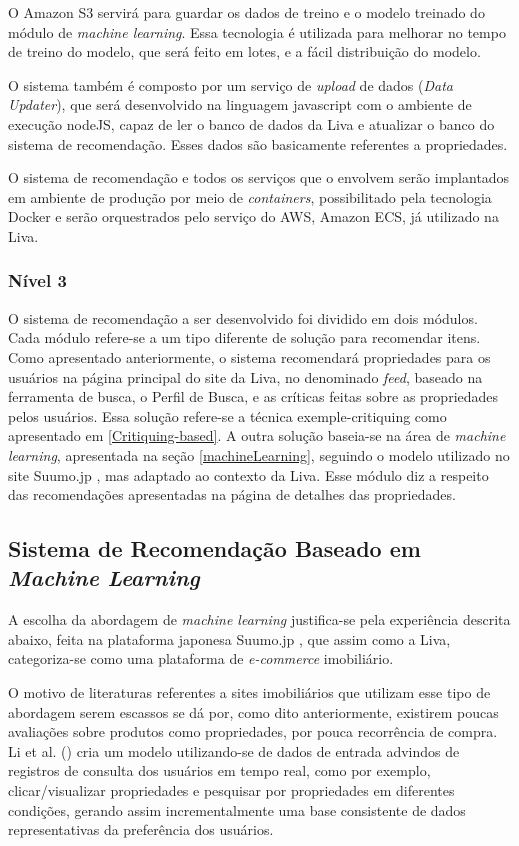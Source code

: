 O Amazon S3 servirá para guardar os dados de treino e o modelo treinado do módulo de \textit{machine learning}. Essa tecnologia é utilizada para melhorar no tempo de treino do modelo, que será feito em lotes, e a fácil distribuição do modelo.

O sistema também é composto por um serviço de \textit{upload} de dados (\textit{Data Updater}), que será desenvolvido na linguagem javascript com o ambiente de execução nodeJS, capaz de ler o banco de dados da Liva e atualizar o banco do sistema de recomendação. Esses dados são basicamente referentes a propriedades.

O sistema de recomendação e todos os serviços que o envolvem serão implantados em ambiente de produção por meio de \textit{containers}, possibilitado pela tecnologia Docker e serão orquestrados pelo serviço do AWS, Amazon ECS, já utilizado na Liva.
	
\subsubsection{Nível 3}
\label{nivel3}
O sistema de recomendação a ser desenvolvido foi dividido em dois módulos. Cada módulo refere-se a um tipo diferente de solução para recomendar itens. Como apresentado anteriormente, o sistema recomendará propriedades para os usuários na página principal do site da Liva, no denominado \textit{feed}, baseado na ferramenta de busca, o Perfil de Busca, e as críticas feitas sobre as propriedades pelos usuários. Essa solução refere-se a técnica exemple-critiquing como apresentado em \ref{Critiquing-based}. A outra solução baseia-se na área de \textit{machine learning}, apresentada na seção \ref{machineLearning}, seguindo o modelo utilizado no site Suumo.jp \cite{Summo:2017}, mas adaptado ao contexto da Liva. Esse módulo diz a respeito das recomendações apresentadas na página de detalhes das propriedades.

\subsection{Sistema de Recomendação Baseado em \textit{Machine Learning}}

A escolha da abordagem de \textit{machine learning} justifica-se pela experiência descrita abaixo, feita na plataforma japonesa Suumo.jp \cite{Summo:2017}, que assim como a Liva, categoriza-se como uma plataforma de \textit{e-commerce} imobiliário.

O motivo de literaturas referentes a sites imobiliários que utilizam esse tipo de abordagem serem escassos se dá por, como dito anteriormente, existirem poucas avaliações sobre produtos como propriedades, por pouca recorrência de compra. Li et al. (\citeyear{Summo:2017}) cria um modelo utilizando-se de dados de entrada advindos de registros de consulta dos usuários em tempo real, como por exemplo, clicar/visualizar propriedades e pesquisar por propriedades em diferentes condições, gerando assim incrementalmente uma base consistente de dados representativas da preferência dos usuários.

